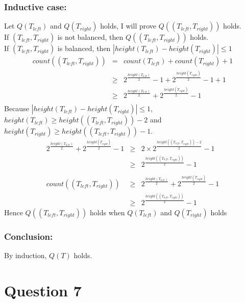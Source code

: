 \documentclass{article} %
\begin{document}
\subsubsection*{Inductive case:}
Let $Q(T_{left})$ and $Q(T_{right})$ holds, I will prove $Q((T_{left},T_{right}))$ holds.\\
If $(T_{left},T_{right})$ is not balanced, then $Q((T_{left},T_{right}))$ holds.\\
If $(T_{left},T_{right})$ is balanced, then $\left| height(T_{left}) - height(T_{right}) \right| \leq 1$\\
\[\begin{array}{rll}
    count((T_{left}, T_{right}))&=&     count(T_{left}) + count(T_{right}) + 1\\
                                &\geq&  2^{\frac{height(T_{left})}{2}} - 1 + 2^{\frac{height(T_{right})}{2}} - 1 + 1\\
                                &\geq&  2^{\frac{height(T_{left})}{2}} + 2^{\frac{height(T_{right})}{2}} - 1\\
\end{array}\]
Because $\left| height(T_{left}) - height(T_{right}) \right| \leq 1$, $height(T_{left}) \geq height((T_{left},T_{right})) - 2$ and $height(T_{right}) \geq height((T_{left},T_{right})) - 1$.\\
\[\begin{array}{rll}
    2^{\frac{height(T_{left})}{2}} + 2^{\frac{height(T_{right})}{2}} - 1 &\geq&  2\times 2^{\frac{height((T_{left},T_{right})) - 2}{2}} - 1\\
                                                                        &\geq& 2^{\frac{height((T_{left},T_{right}))}{2}} - 1\\
                                                                        \\
    count((T_{left}, T_{right}))&\geq& 2^{\frac{height(T_{left})}{2}} + 2^{\frac{height(T_{right})}{2}} - 1\\
                                &\geq& 2^{\frac{height((T_{left},T_{right}))}{2}} - 1                                                         
\end{array}\]
Hence $Q((T_{left},T_{right}))$ holds when $Q(T_{left})$ and $Q(T_{right})$ holds
\subsubsection*{Conclusion:}
By induction, $Q(T)$ holds.\\
\section*{Question 7}
\end{document}
